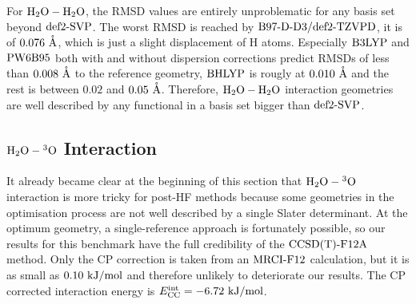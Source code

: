 \documentclass[8.5pt,twoside,twocolumn]{article}
\renewcommand{\Ang}{\mathring{\te{A}}}
\newcommand\kmo{\enmat{\te {kJ/mol}}}
\theoremstyle{standard}
\begin{document}
For $\mbox{\ensuremath{\text H _2 \text O-\text H _2 \text O}}$, the RMSD values are entirely unproblematic for any basis set beyond
$\text{def2-SVP}$. The worst RMSD is reached by $\text{B97-D}\text{-D3}/\text{def2-TZVPD}$, it is of \mbox{$0.076\ \Ang$},
which is just a slight displacement of H atoms. Especially $\text{B3LYP}$ and $\text{PW6B95}$ both
with and without dispersion corrections predict RMSDs of less than $0.008\ \Ang$
to the reference geometry, $\text{BHLYP}$ is rougly at $0.010\ \Ang$ and the
rest is between $0.02$ and $0.05\ \Ang$. Therefore, $\mbox{\ensuremath{\text H _2 \text O-\text H _2 \text O}}$ interaction geometries
are well described by any functional in a basis set bigger than $\text{def2-SVP}$.


\subsection{$\mbox{\ensuremath{\text H _2 \text O-\hspace{.2pt} ^3\text{O}}}$ Interaction}

It already became clear at the beginning of this section that $\mbox{\ensuremath{\text H _2 \text O-\hspace{.2pt} ^3\text{O}}}$ interaction is
more tricky for post-HF methods because some geometries in the optimisation process
are not well described by a single Slater determinant. At the optimum geometry,
a single-reference approach is fortunately possible, so our results for this
benchmark have the full credibility of the $\text{CCSD(T)-F12A}$ method. Only the CP
correction is taken from an $\text{MRCI-F12}$ calculation, but it is as small as
\mbox{$0.10\ \kmo$} and therefore unlikely to deteriorate our results.
The CP corrected interaction energy is \mbox{$\ecc=-6.72\ \kmo$}.
\end{document}
